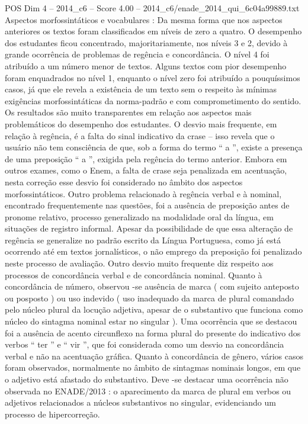 \begin{textsample}{POS Dim 4 – 2014\_c6 – Score 4.00 – 2014\_c6/enade\_2014\_qui\_6c04a99889.txt}
Aspectos morfossintáticos e vocabulares : Da mesma forma que nos aspectos anteriores os textos foram classificados em níveis de zero a quatro.
O desempenho dos estudantes ficou concentrado, majoritariamente, nos níveis 3 e 2, devido à grande ocorrência de problemas de regência e concordância.
O nível 4 foi atribuído a um número menor de textos.
Alguns textos com pior desempenho foram enquadrados no nível 1, enquanto o nível zero foi atribuído a pouquíssimos casos, já que ele revela a existência de um texto sem o respeito às mínimas exigências morfossintáticas da norma-padrão e com comprometimento do sentido.
Os resultados são muito transparentes em relação aos aspectos mais problemáticos do desempenho dos estudantes.
O desvio mais frequente, em relação à regência, é a falta do sinal indicativo da crase – isso revela que o usuário não tem consciência de que, sob a forma do termo “ a ”, existe a presença de uma preposição “ a ”, exigida pela regência do termo anterior.
Embora em outros exames, como o Enem, a falta de crase seja penalizada em acentuação, nesta correção esse desvio foi considerado no âmbito dos aspectos morfossintáticos.
Outro problema relacionado à regência verbal e à nominal, encontrado frequentemente nas questões, foi a ausência de preposição antes de pronome relativo, processo generalizado na modalidade oral da língua, em situações de registro informal.
Apesar da possibilidade de que essa alteração de regência se generalize no padrão escrito da Língua Portuguesa, como já está ocorrendo até em textos jornalísticos, o não emprego da preposição foi penalizado neste processo de avaliação.
Outro desvio muito frequente diz respeito aos processos de concordância verbal e de concordância nominal.
Quanto à concordância de número, observou -se ausência de marca ( com sujeito anteposto ou posposto ) ou uso indevido ( uso inadequado da marca de plural comandado pelo núcleo plural da locução adjetiva, apesar de o substantivo que funciona como núcleo do sintagma nominal estar no singular ).
Uma ocorrência que se destacou foi a ausência de acento circunflexo na forma plural do presente do indicativo dos verbos “ ter ” e “ vir ”, que foi considerada como um desvio na concordância verbal e não na acentuação gráfica.
Quanto à concordância de gênero, vários casos foram observados, normalmente no âmbito de sintagmas nominais longos, em que o adjetivo está afastado do substantivo.
Deve -se destacar uma ocorrência não observada no ENADE/2013 : o aparecimento da marca de plural em verbos ou adjetivos relacionados a núcleos substantivos no singular, evidenciando um processo de hipercorreção.

\end{textsample}
